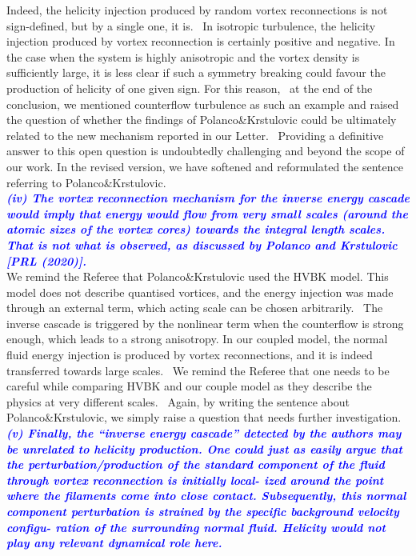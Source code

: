 \documentclass[a4paper,10pt]{article}
\def\blue#1{\textcolor{blue}{#1}}
\def\refcomment#1{\textbf{\blue{\emph{#1}}}\\}
\begin{document}
Indeed, the helicity injection produced by random vortex reconnections is not sign-defined, but by a single one, it is.  In isotropic turbulence, the helicity injection produced by vortex reconnection is certainly positive and negative. In the case when the system is highly anisotropic and the vortex density is sufficiently large, it is less clear if such a symmetry breaking could favour the production of helicity of one given sign. For this reason,  at the end of the conclusion, we mentioned counterflow turbulence as such an example and raised the question of whether the findings of Polanco\&Krstulovic could be ultimately related to the new mechanism reported in our Letter.  Providing a definitive answer to this open question is undoubtedly challenging and beyond the scope of our work. In the revised version, we have softened and reformulated the sentence referring to Polanco\&Krstulovic.\\

\refcomment{(iv) The vortex reconnection mechanism for the inverse energy cascade would imply that energy would flow from very small scales (around the atomic sizes of the vortex cores) towards the integral length scales. That is not what is observed, as discussed by Polanco and Krstulovic [PRL (2020)].}

We remind the Referee that Polanco\&Krstulovic used the HVBK model. This model does not describe quantised vortices, and the energy injection was made through an external term, which acting scale can be chosen arbitrarily.  The inverse cascade is triggered by the nonlinear term when the counterflow is strong enough, which leads to a strong anisotropy. In our coupled model, the normal fluid energy injection is produced by vortex reconnections, and it is indeed transferred towards large scales.  We remind the Referee that one needs to be careful while comparing HVBK and our couple model as they describe the physics at very different scales.  Again, by writing the sentence about Polanco\&Krstulovic, we simply raise a question that needs further investigation.\\

\refcomment{(v) Finally, the “inverse energy cascade” detected by the authors may be unrelated to helicity production. One could just as easily argue that the perturbation/production of the standard component of the fluid through vortex reconnection is initially local- ized around the point where the filaments come into close contact. Subsequently, this normal component perturbation is strained by the specific background velocity configu- ration of the surrounding normal fluid. Helicity would not play any relevant dynamical role here.}
\end{document}
